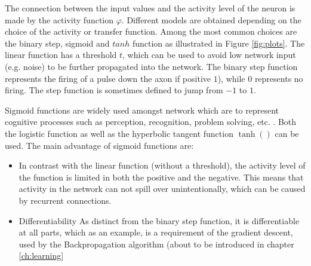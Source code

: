 \documentclass[10pt,a4paper,DIV=11]{scrreprt}
\begin{document}
The connection between the input values and the activity level of the neuron is made by the activity function $\varphi$. Different models are 
obtained depending on the choice of the activity or transfer function. Among the most common choices are the binary step, 
sigmoid and $tanh$ function as illustrated in Figure \ref{fig:plots}. The linear function has a threshold $t$, which can be used to avoid 
low network input (e.g. noise) to be further propagated into the network. The binary step function represents the firing of a pulse down the axon 
if positive $1$), while $0$ represents no firing. The step function is sometimes defined to jump from $-1$ to $1$. 

Sigmoid functions are widely used amongst network which are to represent cognitive processes such as perception, recognition, problem solving, 
etc. .
Both the logistic function as well as the hyperbolic tangent function $\tanh()$ can be used. The main advantage of sigmoid functions are:

\begin{itemize}
\item In contrast with the linear function (without a threshold), the activity level of the function is limited in both the positive and the negative. This means that activity in the network can not spill over unintentionally, which can be caused by recurrent connections.
\item Differentiability
As distinct from the binary step function, it is differentiable at all parts, which as an example, is a requirement of the gradient descent, used by the Backpropagation algorithm (about to be introduced in chapter \ref{ch:learning}
\end{itemize}
\end{document}
